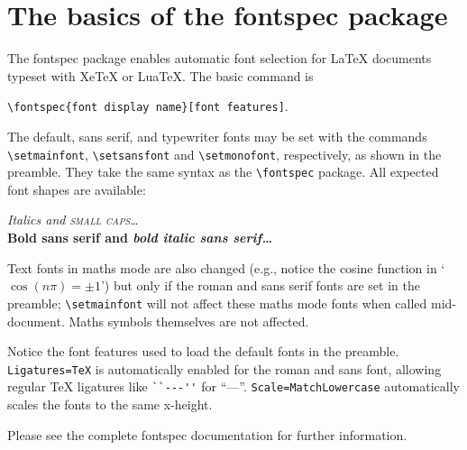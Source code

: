 \documentclass{article}
\begin{document}
\pagestyle{empty}

\section*{The basics of the \textsf{fontspec} package}

The \textsf{fontspec} package enables automatic font selection
for \LaTeX{} documents typeset with Xe\TeX{} or Lua\TeX.
The basic command is

{\centering \verb|\fontspec{font display name}[font features]|.\par}

The default, sans serif, and typewriter fonts may be set with the
commands \verb|\setmainfont|, \verb|\setsansfont| and \verb|\setmonofont|,
respectively, as shown in the preamble. They take the
same syntax as the \verb|\fontspec| package. All expected font
shapes are available:

\begin{center}
  {\itshape Italics and \scshape small caps\dots}\\
  {\sffamily\bfseries Bold sans serif and \itshape bold italic sans serif\dots}
\end{center}

Text fonts in maths mode are also changed (e.g., notice the cosine function in
`$\cos(n\pi)=\pm 1$') but only if the roman and sans serif fonts are set in
the preamble; \verb|\setmainfont| will not affect these maths mode fonts when
called mid-document.
Maths symbols themselves are not affected.

Notice the font features used to load the default fonts in the preamble.
\verb|Ligatures=TeX| is automatically enabled for the roman and sans font,
allowing regular \TeX{} ligatures like \verb|``---''| for ``---''.
\verb|Scale=MatchLowercase| automatically scales the fonts to
the same x-height.

Please see the complete \textsf{fontspec} documentation for further
information.
\end{document}
